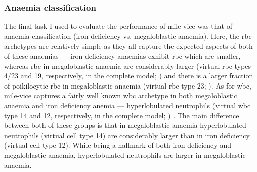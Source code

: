 \begin{figure}[!ht]
    \label{fig:mile-vice-vcq-so-mds-classification}
\end{figure}

\begin{figure}[!ht]
    \label{fig:rbc-mds-classification-examples}
\end{figure}

\begin{figure}[!ht]
    \label{fig:wbc-mds-classification-examples}
\end{figure}

\subsubsection{Anaemia classification} 

The final task I used to evaluate the performance of \ac{mile-vice} was that of anaemia classification (iron deficiency vs. megaloblastic anaemia). Here, the \ac{rbc} archetypes are relatively simple as they all capture the expected aspects of both of these anaemias --- iron deficiency anaemias exhibit \ac{rbc} which are smaller, whereas \ac{rbc} in megaloblastic anaemia are considerably larger (virtual \ac{rbc} types 4/23 and 19, respectively, in the complete model; ) and there is a larger fraction of poikilocytic \ac{rbc} in megaloblastic anaemia (virtual \ac{rbc} type 23; ). As for \ac{wbc}, \ac{mile-vice} captures a fairly well known \ac{wbc} archetype in both megaloblastic anaemia and iron deficiency anemia --- hyperlobulated neutrophils (virtual \ac{wbc} type 14 and 12, respectively, in the complete model; ) \cite{Lindenbaum1980-ux,Westerman1999-gs}. The main difference between both of these groups is that in megaloblastic anaemia hyperlobulated neutrophils (virtual cell type 14) are considerably larger than in iron deficiency (virtual cell type 12). While being a hallmark of both iron deficiency and megaloblastic anaemia, hyperlobulated neutrophils are larger in megaloblastic anaemia.

